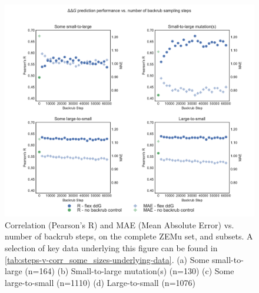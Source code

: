 \begin{figure}
  \includegraphics[width=\textwidth,keepaspectratio]{steps-v-corr_some_sizes.pdf}
  \caption[Flex ddG performance vs. number of backrub steps]{
    Correlation (Pearson's R) and MAE (Mean Absolute Error) vs. number of backrub steps, on the complete ZEMu set, and subsets.
    A selection of key data underlying this figure can be found in \cref{tab:steps-v-corr_some_sizes-underlying-data}.
    (a) Some small-to-large (n=164)
    (b) Small-to-large mutation(s) (n=130)
    (c) Some large-to-small (n=1110)
    (d) Large-to-small (n=1076)
  } \label{fig:steps-v-corr_some_sizes}
\end{figure}
